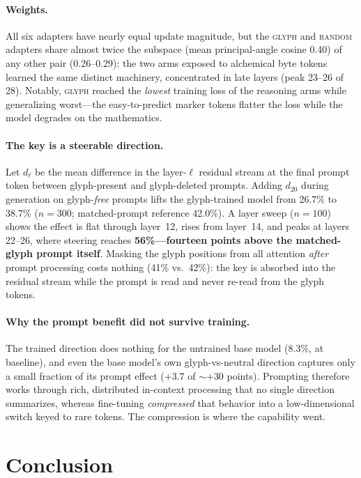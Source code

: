 \documentclass[11pt]{article}
\newcommand{\arm}[1]{\textsc{#1}}
\begin{document}
\paragraph{Weights.}
All six adapters have nearly equal update magnitude, but the \arm{glyph} and \arm{random} adapters share almost twice the subspace (mean principal-angle cosine 0.40) of any other pair (0.26--0.29): the two arms exposed to alchemical byte tokens learned the same distinct machinery, concentrated in late layers (peak 23--26 of 28).
Notably, \arm{glyph} reached the \emph{lowest} training loss of the reasoning arms while generalizing worst---the easy-to-predict marker tokens flatter the loss while the model degrades on the mathematics.

\paragraph{The key is a steerable direction.}
Let $d_\ell$ be the mean difference in the layer-$\ell$ residual stream at the final prompt token between glyph-present and glyph-deleted prompts.
Adding $d_{20}$ during generation on glyph-\emph{free} prompts lifts the glyph-trained model from 26.7\% to 38.7\% ($n=300$; matched-prompt reference 42.0\%).
A layer sweep ($n=100$) shows the effect is flat through layer~12, rises from layer~14, and peaks at layers 22--26, where steering reaches \textbf{56\%---fourteen points above the matched-glyph prompt itself}.
Masking the glyph positions from all attention \emph{after} prompt processing costs nothing (41\% vs.\ 42\%): the key is absorbed into the residual stream while the prompt is read and never re-read from the glyph tokens.

\paragraph{Why the prompt benefit did not survive training.}
The trained direction does nothing for the untrained base model (8.3\%, at baseline), and even the base model's own glyph-vs-neutral direction captures only a small fraction of its prompt effect ($+3.7$ of $\sim{+}30$ points).
Prompting therefore works through rich, distributed in-context processing that no single direction summarizes, whereas fine-tuning \emph{compressed} that behavior into a low-dimensional switch keyed to rare tokens.
The compression is where the capability went.

\section{Conclusion}
\end{document}
